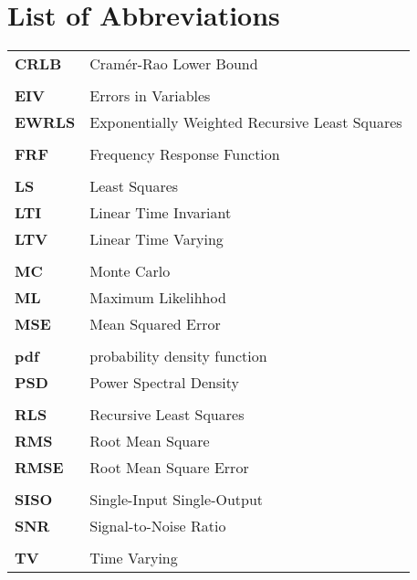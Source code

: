 \chapter*{List of Abbreviations}
\begin{longtable}[c]{>{\raggedleft}p{}>{\raggedright}p{}}
\textbf{CRLB} &   Cram\'er-Rao Lower Bound\tabularnewline
\tabularnewline
\textbf{EIV} &  Errors in Variables\tabularnewline
\textbf{EWRLS} &  Exponentially Weighted Recursive Least Squares\tabularnewline
\tabularnewline
\textbf{FRF} &   Frequency Response Function\tabularnewline
\tabularnewline
\textbf{LS} &  Least Squares\tabularnewline
\textbf{LTI} &  Linear Time Invariant\tabularnewline
\textbf{LTV} &  Linear Time Varying\tabularnewline
\tabularnewline
\textbf{MC} &  Monte Carlo\tabularnewline
\textbf{ML} &  Maximum Likelihhod\tabularnewline
\textbf{MSE} &  Mean Squared Error\tabularnewline
\tabularnewline
\textbf{pdf} &  probability density function\tabularnewline
\textbf{PSD} &  Power Spectral Density\tabularnewline
\tabularnewline
\textbf{RLS} &  Recursive Least Squares\tabularnewline
\textbf{RMS} &  Root Mean Square \tabularnewline
\textbf{RMSE} &  Root Mean Square Error\tabularnewline
\tabularnewline
\textbf{SISO} &  Single-Input Single-Output\tabularnewline
\textbf{SNR} &   Signal-to-Noise Ratio\tabularnewline
\tabularnewline
\textbf{TV} &   Time Varying\tabularnewline

\end{longtable}
